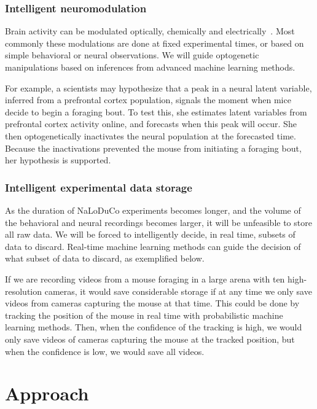 \documentclass[12pt]{article}
\begin{document}
\subsubsection*{Intelligent neuromodulation}

Brain activity can be modulated optically, chemically and
electrically~\citep{}.
%
Most commonly these modulations are done at fixed experimental times, or based on
simple behavioral or neural observations.
%
We will guide optogenetic manipulations based on inferences from advanced
machine learning methods.

For example, a scientists may hypothesize that a peak in a neural latent
variable, inferred from a prefrontal cortex population, signals the moment when
mice decide to begin a foraging bout.  To test this, she estimates latent
variables from prefrontal cortex activity online, and forecasts when this peak
will occur. She then optogenetically inactivates the neural population at the
forecasted time.  Because the inactivations prevented the mouse from initiating
a foraging bout, her hypothesis is supported.

\subsubsection*{Intelligent experimental data storage}

As the duration of NaLoDuCo experiments becomes longer, and the volume of the
behavioral and neural recordings becomes larger, it will be unfeasible to
store all raw data. We will be forced to intelligently decide, in real time,
subsets of data to discard. Real-time machine learning methods can guide the
decision of what subset of data to discard, as exemplified below.

If we are recording videos from a mouse foraging in a large arena
with ten high-resolution cameras, it would save considerable storage if at any
time we only save videos from cameras capturing the mouse at that time.  This
could be done by tracking the position of the mouse in real time with
probabilistic machine learning methods. Then, when the confidence of the
tracking is high, we would only save videos of cameras capturing the mouse at
the tracked position, but when the confidence is low, we would save all videos.

\section{Approach}
\end{document}
